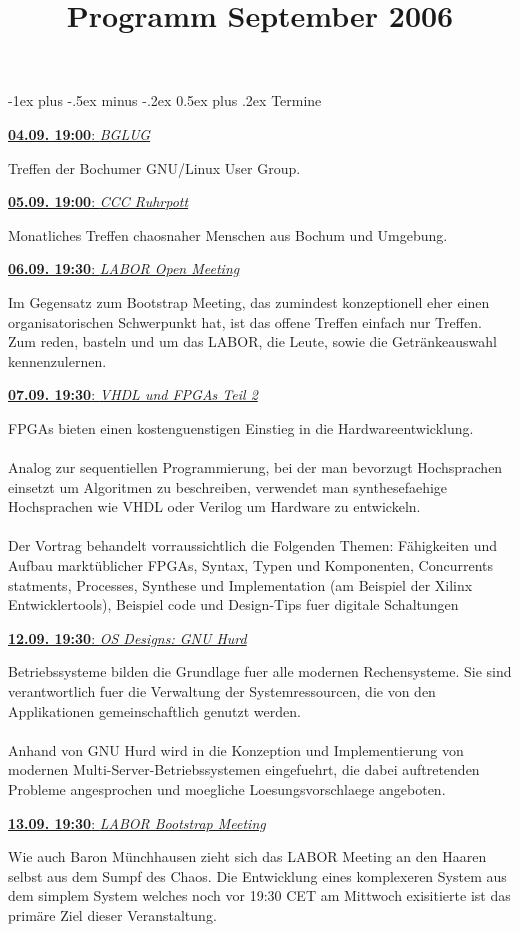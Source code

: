 \documentclass[10pt,landscape,a4paper]{article}
\makeatletter
\renewcommand{\section}{\@startsection{section}{1}{0mm}%
    {-1ex plus -.5ex minus -.2ex}%
    {0.5ex plus .2ex}%
    {\normalfont\large\bfseries}}
\def\termin#1#2#3{

\noindent
\vbox{\underline{\textbf{#2}: \textit{#1}}}
#3
\vskip 4mm
}
\makeatother
\begin{document}
\begin{multicols}{3}

\title{Programm September 2006}

\section{Termine}

\termin{BGLUG}{04.09. 19:00}
{
Treffen der Bochumer GNU/Linux User Group.
}

\termin{CCC Ruhrpott}{05.09. 19:00}
{
Monatliches Treffen chaosnaher Menschen aus Bochum und Umgebung.
}

\termin{LABOR Open Meeting}{06.09. 19:30}
{
Im Gegensatz zum Bootstrap Meeting, das zumindest konzeptionell eher
einen organisatorischen Schwerpunkt hat, ist das offene Treffen einfach
nur Treffen. Zum reden, basteln und um das LABOR, die Leute, sowie die
Getr\"ankeauswahl kennenzulernen.
}

\termin{VHDL und FPGAs Teil 2}{07.09. 19:30}
{
FPGAs bieten einen kostenguenstigen Einstieg in die Hardwareentwicklung.\\
\\
Analog zur sequentiellen Programmierung, bei der man bevorzugt Hochsprachen
einsetzt um Algoritmen zu beschreiben, verwendet man synthesefaehige
Hochsprachen wie VHDL oder Verilog um Hardware zu entwickeln.\\
\\
Der Vortrag behandelt vorraussichtlich die Folgenden Themen:
F\"ahigkeiten und Aufbau markt\"ublicher FPGAs,
Syntax, Typen und Komponenten,
Concurrents statments, Processes,
Synthese und Implementation (am Beispiel der Xilinx Entwicklertools),
Beispiel code und
Design-Tips fuer digitale Schaltungen
}

\termin{OS Designs: GNU Hurd}{12.09. 19:30}
{
Betriebssysteme bilden die Grundlage fuer alle modernen Rechensysteme. Sie
sind verantwortlich fuer die Verwaltung der Systemressourcen, die von den
Applikationen gemeinschaftlich genutzt werden.\\
\\
Anhand von GNU Hurd wird in die Konzeption und Implementierung von modernen
Multi-Server-Betriebssystemen eingefuehrt, die dabei auftretenden Probleme
angesprochen und moegliche Loesungsvorschlaege angeboten.
}

\termin{LABOR Bootstrap Meeting}{13.09. 19:30}
{
Wie auch Baron M\"unchhausen zieht sich das LABOR Meeting an den Haaren
selbst aus dem Sumpf des Chaos. Die Entwicklung eines komplexeren System
aus dem simplem System welches noch vor 19:30 CET am Mittwoch exisitierte
ist das prim\"are Ziel dieser Veranstaltung.
}


\end{multicols}
\end{document}
